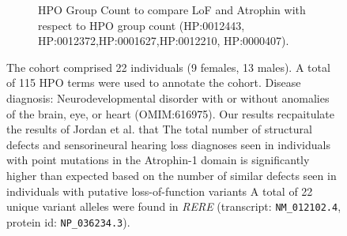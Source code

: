 \begin{figure}[htbp]
\vspace{2em}

\begin{subfigure}[b]{0.95\textwidth}
\captionsetup{justification=raggedright,singlelinecheck=false}
\caption{HPO Group Count to compare LoF and Atrophin with respect to HPO group count (HP:0012443, HP:0012372,HP:0001627,HP:0012210, HP:0000407).}
\end{subfigure}

\vspace{2em}

\caption{ The cohort comprised 22 individuals (9 females, 13 males). A total of 115 HPO terms were used to annotate the cohort. 
Disease diagnosis: Neurodevelopmental disorder with or without anomalies of the brain, eye, or heart (OMIM:616975). 
Our results recpaitulate the results of  Jordan et al. \cite{PMID_29330883} that The total number of structural defects and sensorineural hearing loss diagnoses seen in individuals with point mutations in the 
Atrophin-1 domain is significantly higher than expected based on the number of similar defects seen in individuals with putative loss-of-function variants
A total of 22 unique variant alleles were found in \textit{RERE} (transcript: \texttt{NM\_012102.4}, protein id: \texttt{NP\_036234.3}).}
\end{figure}
